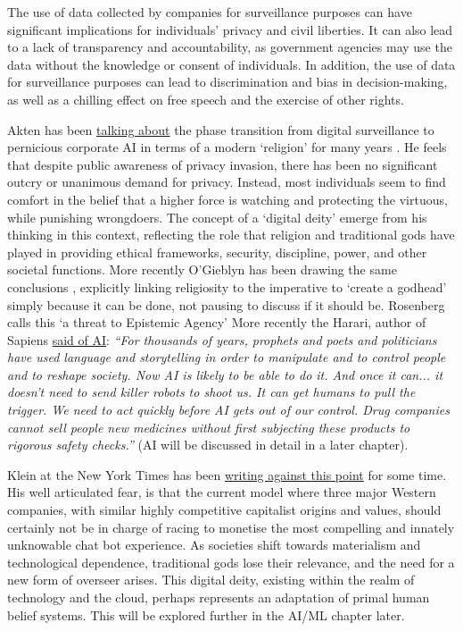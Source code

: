 The use of data collected by companies for surveillance purposes can have significant implications for individuals' privacy and civil liberties. It can also lead to a lack of transparency and accountability, as government agencies may use the data without the knowledge or consent of individuals. In addition, the use of data for surveillance purposes can lead to discrimination and bias in decision-making, as well as a chilling effect on free speech and the exercise of other rights.\par
Akten has been \href{https://memoakten.medium.com/all-watched-over-by-machines-of-loving-grace-8c2464aa6fda}{talking about} the phase transition from digital surveillance to pernicious corporate AI in terms of a modern `religion' for many years \cite{bayer2023artificial}. He feels that despite public awareness of privacy invasion, there has been no significant outcry or unanimous demand for privacy. Instead, most individuals seem to find comfort in the belief that a higher force is watching and protecting the virtuous, while punishing wrongdoers. The concept of a `digital deity' emerge from his thinking in this context, reflecting the role that religion and traditional gods have played in providing ethical frameworks, security, discipline, power, and other societal functions. More recently O'Gieblyn has been drawing the same conclusions \cite{o2021god}, explicitly linking religiosity to the imperative to `create a godhead' simply because it can be done, not pausing to discuss if it should be. Rosenberg calls this `a threat to Epistemic Agency' \cite{rosenbergmanipulation}More recently the Harari, author of Sapiens \cite{harari2014sapiens} \href{https://forumlive.frontiersin.org/agenda/speakers/2977577}{said of AI}: \textit{``For thousands of years, prophets and poets and politicians have used language and storytelling in order to manipulate and to control people and to reshape society. Now AI is likely to be able to do it. And once it can... it doesn't need to send killer robots to shoot us. It can get humans to pull the trigger. We need to act quickly before AI gets out of our control. Drug companies cannot sell people new medicines without first subjecting these products to rigorous safety checks.''} (AI will be discussed in detail in a later chapter).\par
Klein at the New York Times has been \href{https://www.nytimes.com/2023/03/12/opinion/chatbots-artificial-intelligence-future-weirdness.html}{writing against this point} for some time. His well articulated fear, is that the current model where three major Western companies, with similar highly competitive capitalist origins and values, should certainly not be in charge of racing to monetise the most compelling and innately unknowable chat bot experience. As societies shift towards materialism and technological dependence, traditional gods lose their relevance, and the need for a new form of overseer arises. This digital deity, existing within the realm of technology and the cloud, perhaps represents an adaptation of primal human belief systems. This will be explored further in the AI/ML chapter later.\par 
